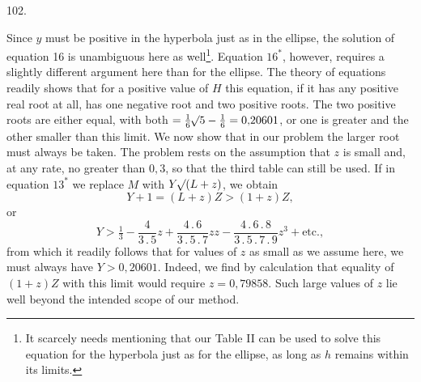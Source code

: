 \par{}\medskip
{}
\begin{center}102.\end{center}
Since $y$ must be positive in the hyperbola just as in the ellipse, the solution of equation 16 is unambiguous here as well\footnote{It scarcely needs mentioning that our Table II can be used to solve this equation for the hyperbola just as for the ellipse, as long as $h$ remains within its limits.}. Equation $16^*$, however, requires a slightly different argument here than for the ellipse. The theory of equations readily shows that for a positive value of $H$ this equation, if it has any positive real root at all, has one negative root and two positive roots. The two positive roots are either equal, with both $=\tfrac16\mathord{{}^{}\!\surd}5-\tfrac16=0{,}20601$, or one is greater and the other smaller than this limit. We now show that in our problem the larger root must always be taken. The problem rests on the assumption that $z$ is small and, at any rate, no greater than $0{,}3$, so that the third table can still be used. If in equation $13^*$ we replace $M$ with $Y\mathord{{}^{}\!\surd}(L+z)$, we obtain
\[
Y+1=(L+z)Z>(1+z)Z,
\]
\noindent or
\[
Y>\tfrac13-\frac4{3\mathpunct{.}5}z+\frac{4\mathpunct{.}6}{3\mathpunct{.}5\mathpunct{.}7}zz-\frac{4\mathpunct{.}6\mathpunct{.}8}{3\mathpunct{.}5\mathpunct{.}7\mathpunct{.}9}z^3+\text{etc.},
\]
\noindent from which it readily follows that for values of $z$ as small as we assume here, we must always have $Y>0{,}20601$. Indeed, we find by calculation that equality of $(1+z)Z$ with this limit would require $z=0{,}79858$. Such large values of $z$ lie well beyond the intended scope of our method.
